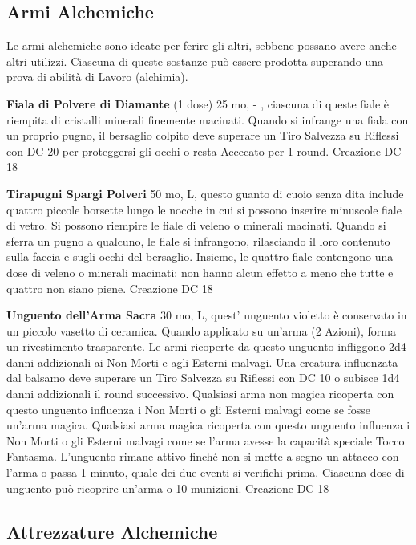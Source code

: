 \documentclass[a4paper,11pt,twoside,openany]{book}
\begin{document}
{\pagebreak

\subsection{Armi Alchemiche}

\label{armi-alchemiche}

Le armi alchemiche sono ideate per ferire gli altri, sebbene possano avere anche altri utilizzi. Ciascuna di queste sostanze può essere prodotta superando una prova di abilità di Lavoro (alchimia).

\textbf{Fiala di Polvere di Diamante} (1 dose) 25 mo, - , ciascuna di queste fiale è riempita di cristalli minerali finemente macinati. Quando si infrange una fiala con un proprio pugno, il bersaglio colpito deve superare un Tiro Salvezza su Riflessi con DC 20 per proteggersi gli occhi o resta Accecato per 1 round. Creazione DC 18

\textbf{Tirapugni Spargi Polveri} 50 mo, L, questo guanto di cuoio senza dita include quattro piccole borsette lungo le nocche in cui si possono inserire minuscole fiale di vetro. Si possono riempire le fiale di veleno o minerali macinati. 
Quando si sferra un pugno a qualcuno, le fiale si infrangono, rilasciando il loro contenuto sulla faccia e sugli occhi del bersaglio. Insieme, le quattro fiale contengono una dose di veleno o minerali macinati; non hanno alcun effetto a meno che tutte e quattro non siano piene. Creazione DC 18

\textbf{Unguento dell'Arma Sacra} 30 mo, L, quest' unguento violetto è conservato in un piccolo vasetto di ceramica. Quando applicato su un'arma (2 Azioni), forma un rivestimento trasparente. Le armi ricoperte da questo unguento infliggono 2d4 danni addizionali ai Non Morti e agli Esterni malvagi. 
Una creatura influenzata dal balsamo deve superare un Tiro Salvezza su Riflessi con DC 10 o subisce 1d4 danni addizionali il round successivo. Qualsiasi arma non magica ricoperta con questo unguento influenza i Non Morti o gli Esterni malvagi come se fosse un'arma magica. Qualsiasi arma magica ricoperta con questo unguento influenza i Non Morti o gli Esterni malvagi come se l'arma avesse la capacità speciale Tocco Fantasma. L'unguento rimane attivo finché non si mette a segno un attacco con l'arma o passa 1 minuto, quale dei due eventi si verifichi prima. Ciascuna dose di unguento può ricoprire un'arma o 10 munizioni. Creazione DC 18

\subsection{Attrezzature Alchemiche}

}
\end{document}
